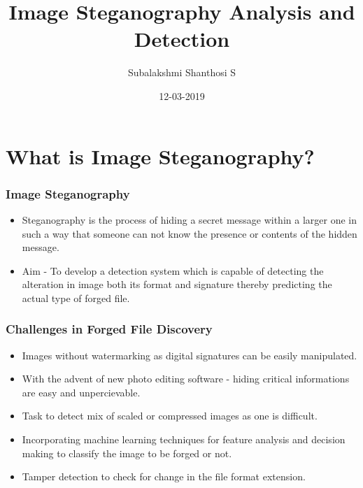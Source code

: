 \documentclass{beamer} %
\title{Image Steganography Analysis and Detection}
\author{Subalakshmi Shanthosi S}
\institute{SSN College of Engineering}
\date{}
\date[short date]{12-03-2019}
\theoremstyle{definition} %
\begin{document}
\begin{frame} 
\titlepage
\end{frame}

\section{What is Image Steganography?} %

\begin{frame} 
\frametitle{Image Steganography}
 \begin{itemize}
 \item{Steganography is the process of hiding a secret message within a
 larger one in such a way that someone can not know the presence or contents
 of the hidden message.}
\end{itemize}
\begin{itemize}
 \item{Aim - To develop a detection system which is capable of detecting the alteration in image both its format and signature thereby predicting the actual type of forged file.
 }
\end{itemize}

\end{frame}

\begin{frame}
\frametitle{Challenges in Forged File Discovery}
 \begin{itemize}
	\item{Images without watermarking as digital signatures can be easily manipulated.
	}
\end{itemize}
\begin{itemize}
	\item{With the advent of new photo editing software - hiding critical informations are easy and unpercievable. }
\end{itemize}
\begin{itemize}
	\item {Task to detect mix of scaled or compressed images as one is difficult.}
\end{itemize}
\begin{itemize}
	\item{Incorporating machine learning techniques for feature analysis and decision making  to classify the image to be forged or not.
	}
   \item{Tamper detection to check for change in the file format extension.}
\end{itemize}
\end{frame}
\end{document}
